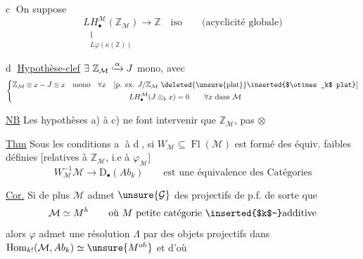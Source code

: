 \textcircled{c} On suppose
\[
\underset{\begin{smallmatrix}\Vert\\L\varphi(\kappa(\mathbb Z))\end{smallmatrix}}
{LH_\bullet^{\mathcal M}(\mathbb Z_{\mathcal M})}\longrightarrow\mathbb Z\quad\text{iso}
\qquad\text{(acyclicité globale)}
\]

\textcircled{d} \uline{Hypothèse-clef}
$\exists\ \mathbb Z_{\mathcal M}\lhook\joinrel\xrightarrow{\alpha}J$ mono, avec
\[
\left\{\begin{gathered}
\mathbb Z_{\mathcal M}\otimes x\mathbin{-}J\otimes x\quad\text{mono}\quad\forall x
\quad[\text{p. ex. }J/\mathbb Z_{\mathcal M}\ \text{\deleted{\unsure{plat}}\inserted{$\otimes_k$ plat}}]\\
LH_\bullet^{\mathcal M}(J\otimes_kx)=0\qquad\forall x\text{ dans }\mathcal M
\end{gathered}\right.
\]


\uline{NB} Les hypothèses a) à c) ne font intervenir que $\mathbb Z_{\mathcal M}$, pas $\otimes$

\uline{Thm}  Sous les conditions \textcircled{a} à \textcircled{d}, si
$W_{\mathcal M}\subseteq\operatorname{Fl}(\mathcal M)$ est formé des équiv. faibles définies
 [relatives à $\mathbb Z_{\mathcal M}$, i.e à $\varphi_{\mathcal M}$]
\[
W_{\mathcal M}^{-1}\mathcal M\longrightarrow\mathrm D_\bullet(Ab_k)
\qquad\text{est une équivalence des Catégories}
\]

\uline{Cor.} Si de plus $\mathcal M$ admet 
$\unsure{\mathcal G}$ des  projectifs de p.f.
de sorte que
\[
\mathcal M\simeq M^h\qquad\text{où $M$ petite catégorie \inserted{$k$-}additive}
\]
alors $\varphi$ admet une résolution $\Lambda$ par des objets projectifs
dans $\operatorname{Hom}_{k!}(\mathcal M,Ab_k)\simeq\unsure{M^{oh}}$
 et d'où



